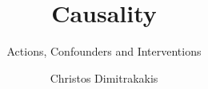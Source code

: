 \documentclass{beamer}
\title{Causality}
\subtitle{Actions, Confounders and Interventions}
\author[C. Dimitrakakis]{Christos Dimitrakakis}
\begin{document}
\begin{frame}
  \titlepage
\end{frame}



\end{document}
